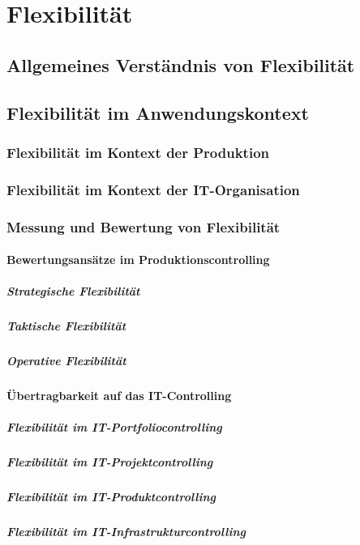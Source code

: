 \section{Flexibilit\"at}
\subsection{Allgemeines Verst\"andnis von Flexibilit\"at}
\subsection{Flexibilit\"at im Anwendungskontext}
\subsubsection{Flexibilit\"at im Kontext der Produktion}
\subsubsection{Flexibilit\"at im Kontext der IT-Organisation}
\subsubsection{Messung und Bewertung von Flexibilit\"at}
\paragraph{Bewertungsans\"atze im Produktionscontrolling}
\subparagraph{Strategische Flexibilit\"at}
\subparagraph{Taktische Flexibilit\"at}
\subparagraph{Operative Flexibilit\"at}
\paragraph{\"Ubertragbarkeit auf das IT-Controlling}
\subparagraph{Flexibilit\"at im IT-Portfoliocontrolling}
\subparagraph{Flexibilit\"at im IT-Projektcontrolling}
\subparagraph{Flexibilit\"at im IT-Produktcontrolling}
\subparagraph{Flexibilit\"at im IT-Infrastrukturcontrolling}